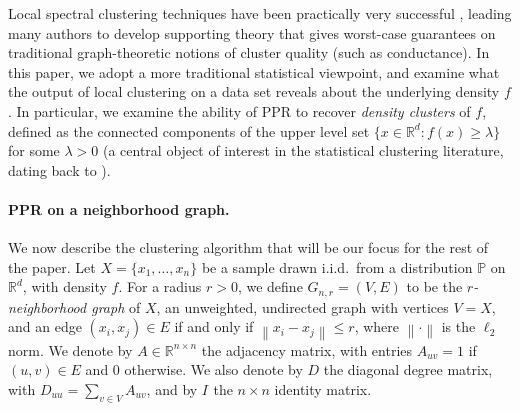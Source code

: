 \documentclass{article}
\newcommand{\Reals}{\mathbb{R}}
\newcommand{\Rd}{\Reals^d}
\newcommand{\norm}[1]{\left\lVert#1\right\rVert}
\newcommand{\1}{\mathbf{1}}
\newcommand{\Abf}{A}
\newcommand{\Xbf}{X}             %
\newcommand{\Dbf}{D}
\newcommand{\Ibf}[1]{I_{#1}}
\newcommand{\Pbb}{\mathbb{P}}
\theoremstyle{aldenthm}
\theoremstyle{aldenrmrk}
\begin{document}
Local spectral clustering techniques have been practically very successful
\citep{leskovec2010,andersen2012,gleich2012,mahoney2012,wu2012}, leading 
many authors to develop supporting theory
\citep{spielman2013,andersen2009,gharan2012,zhu2013} that gives worst-case
guarantees on traditional graph-theoretic notions of cluster quality (such as
conductance).  In this paper, we adopt a more traditional statistical viewpoint,
and examine what the output of local clustering on a data set reveals about the
underlying density $f$.  In particular, we examine the ability of PPR to recover
\emph{density clusters} of $f$, defined as the connected components of
the upper level set $\{x \in \Rd : f(x) \geq \lambda\}$ for some $\lambda > 0$
(a central object of interest in the statistical clustering literature, dating
back to \citet{hartigan1981}).   

\paragraph{PPR on a neighborhood graph.} We now describe the clustering
algorithm that will be our focus for the rest of the paper. Let $\Xbf = \{x_1,
\ldots, x_n\}$ be a sample drawn i.i.d.\ from a distribution $\Pbb$ on $\Rd$,
with density $f$.  For a radius $r > 0$, we define $G_{n,r}=(V,E)$ to be the
\emph{$r$-neighborhood graph} of $\Xbf$, an unweighted, undirected graph with
vertices $V=\Xbf$, and an edge $(x_i,x_j) \in E$ if and only if $\norm{x_i -
x_j} \leq r$, where $\norm{\cdot}$ is the $\ell_2$ norm. We denote by $\Abf \in
\Reals^{n \times n}$ the adjacency matrix, with entries $\Abf_{uv} = 1$ if
$(u,v) \in E$ and $0$ otherwise.  We also denote by $\Dbf$ the diagonal degree
matrix, with $\Dbf_{uu} = \sum_{v \in V} \Abf_{uv}$, and by $\Ibf{}$ the $n
\times n$ identity matrix.
\end{document}
